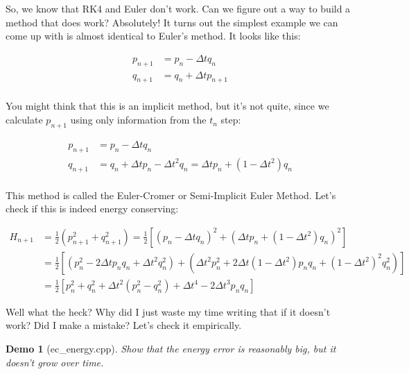 \documentclass{article}
\theoremstyle{demo}
\newtheorem{demo}{Demo}[section]
\begin{document}
So, we know that RK4 and Euler don't work.  Can we figure out a way to build a
method that does work?  Absolutely!  It turns out the simplest example we can
come up with is almost identical to Euler's method.  It looks like this:

\begin{equation}
    \begin{aligned}
        p_{n+1} & = p_n - \Delta t q_n \\
        q_{n+1} & = q_n + \Delta t p_{n+1} \\
    \end{aligned}
\end{equation}

You might think that this is an implicit method, but it's not quite, since we
calculate $p_{n+1}$ using only information from the $t_n$ step:  

\begin{equation}
    \begin{aligned}
        p_{n+1} & = p_n - \Delta t q_n \\
        q_{n+1} & = q_n + \Delta t p_n - \Delta t^2 q_n = \Delta t p_n +
        (1-\Delta t^2) q_n\\
    \end{aligned}
\end{equation}

This method is called the Euler-Cromer or Semi-Implicit Euler Method. Let's
check if this is indeed energy conserving:

\begin{equation}
    \begin{aligned}
        H_{n+1} & = \frac{1}{2}(p_{n+1}^2 + q_{n+1}^2) =
        \frac{1}{2}\left[(p_n - \Delta t q_n)^2 + (\Delta t p_n + (1-\Delta
        t^2)q_n)^2\right]\\
        &= \frac{1}{2}\left[(p_n^2 - 2\Delta t p_n q_n + \Delta t^2 q_n^2) +
        (\Delta t^2 p_n^2 + 2\Delta t(1-\Delta t^2)p_nq_n + (1-\Delta t^2)^2
        q_n^2)\right]\\
        &= \frac{1}{2}\left[p_n^2 + q_n^2 + \Delta t^2(p_n^2-q_n^2) + \Delta t^4
        - 2\Delta t^3 p_n q_n\right]
    \end{aligned}
\end{equation}

Well what the heck?  Why did I just waste my time writing that if it doesn't
work?  Did I make a mistake?  Let's check it empirically.

\begin{demo}[ec\_energy.cpp]
   Show that the energy error is reasonably big, but it doesn't grow over time. 
\end{demo}
\end{document}

